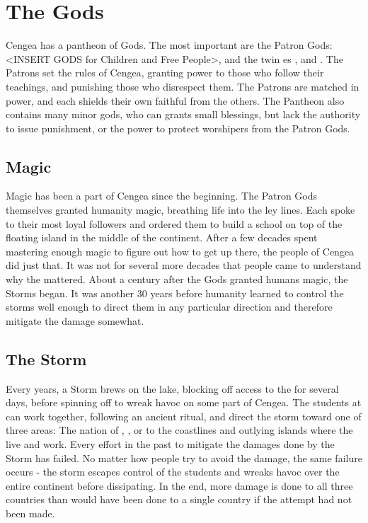 \documentclass[blue]{GL2020}
\begin{document}

\section*{The Gods}
Cengea has a pantheon of Gods. The most important are the Patron Gods: <INSERT GODS for Children and Free People>, and the twin \cEbb{\God}es \cEbbFull{}, and \cFlowFull{}. The Patrons set the rules of Cengea, granting power to those who follow their teachings, and punishing those who disrespect them. The Patrons are matched in power, and each shields their own faithful from the others. The Pantheon also contains many minor gods, who can grants small blessings, but lack the authority to issue punishment, or the power to protect worshipers from the Patron Gods.


\subsection*{Magic}
Magic has been a part of Cengea since the beginning. The Patron Gods themselves granted humanity magic, breathing life into the ley lines. Each spoke to their most loyal followers and ordered them to build a school on top of the floating island in the middle of the continent. After a few decades spent mastering enough magic to figure out how to get up there, the people of Cengea did just that. It was not for several more decades that people came to understand why the \pSc{} mattered. About a century after the Gods granted humans magic, the Storms began. It was another 30 years before humanity learned to control the storms well enough to direct them in any particular direction and therefore mitigate the damage somewhat.


\subsection*{The Storm}
Every \pCycle{} years, a Storm brews on the lake, blocking off access to the \pSc{} for several days, before spinning off to wreak havoc on some part of Cengea. The students at \pSchool{} can work together, following an ancient ritual, and direct the storm toward one of three areas: The nation of \pFarm{}, \pTech{}, or to the coastlines and outlying islands where the \pShippies{} live and work. Every effort in the past to mitigate the damages done by the Storm has failed. No matter how people try to avoid the damage, the same failure occurs - the storm escapes control of the students and wreaks havoc over the entire continent before dissipating. In the end, more damage is done to all three countries than would have been done to a single country if the attempt had not been made. 
\end{document}

